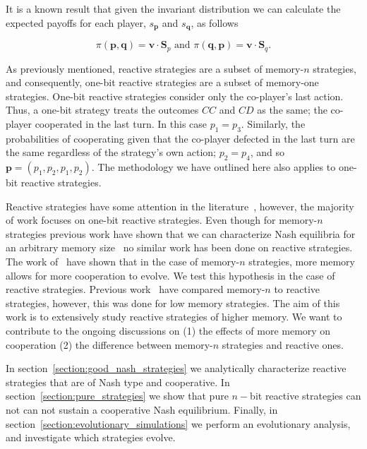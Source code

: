 \documentclass{article}
\theoremstyle{definition}
\begin{document}
It is a known result that given the invariant distribution we can calculate the expected payoffs for
each player, \(s_{\mathbf{p}}\) and \(s_{\mathbf{q}}\), as follows

\begin{equation*}
  \pi(\mathbf{p}, \mathbf{q}) = \mathbf{v} \cdot \mathbf{S}_{p} \text{ and } \pi(\mathbf{q}, \mathbf{p}) = \mathbf{v} \cdot \mathbf{S}_{q}.
\end{equation*}

As previously mentioned, reactive strategies are a subset of memory-\(n\)
strategies, and consequently, one-bit reactive strategies are a subset of
memory-one strategies. One-bit reactive strategies consider only the co-player's
last action. Thus, a one-bit strategy treats the outcomes \(CC\) and \(CD\) as
the same; the co-player cooperated in the last turn. In this case \(p_1 = p_3\).
Similarly, the probabilities of cooperating given that the co-player defected in
the last turn are the same regardless of the strategy's own action; \(p_2 = p_4\),
and so \(\mathbf{p} = (p_1, p_2, p_1, p_2)\). The methodology we have outlined
here also applies to one-bit reactive strategies.

Reactive strategies have some attention in the
literature~\citep{sigmund:JTB:1989, wahl:JTB:1999}, however, the majority of
work focuses on one-bit reactive strategies. Even though for memory-\(n\)
strategies previous work have shown that we can characterize Nash equilibria for
an arbitrary memory size~\citep{hilbe:PNAS:2017, stewart:scientific:2016} no
similar work has been done on reactive strategies. The work
of~\citep{hilbe:PNAS:2017} have shown that in the case of memory-\(n\)
strategies, more memory allows for more cooperation to evolve. We test this
hypothesis in the case of reactive strategies. Previous
work~\citep{baek:scientific:2016} have compared memory-\(n\) to reactive
strategies, however, this was done for low memory strategies. The aim of this
work is to extensively study reactive strategies of higher memory. We want to
contribute to the ongoing discussions on (1) the effects of more memory on
cooperation (2) the difference between memory-\(n\) strategies and reactive
ones.

In section~\ref{section:good_nash_strategies} we analytically characterize
reactive strategies that are of Nash type and cooperative. In
section~\ref{section:pure_strategies} we show that pure \(n-\)bit reactive
strategies can not can not sustain a cooperative Nash equilibrium. Finally, in
section~\ref{section:evolutionary_simulations} we perform an evolutionary analysis, and investigate which strategies
evolve.
\end{document}
